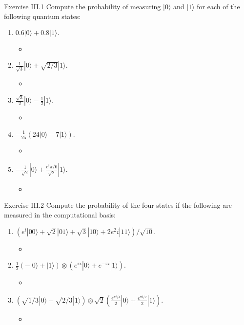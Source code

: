 \documentclass[letterpaper]{article}
\begin{document}
\begin{section}{Exercise III.1}
  Compute the probability of measuring $|0\rangle$ and $|1\rangle$ for each of the following quantum states:
  \begin{enumerate}
    \item $0.6|0\rangle + 0.8|1\rangle$.
    \begin{itemize}
      \item %
  \end{itemize}
    \item $\frac{1}{\sqrt{3}}|0\rangle + \sqrt{2/3}|1\rangle$.
    \begin{itemize}
      \item %
  \end{itemize}
    \item $\frac{\sqrt{3}}{2}|0\rangle - \frac{1}{2}|1\rangle$.
    \begin{itemize}
      \item %
  \end{itemize}
    \item $-\frac{1}{25}(24|0\rangle - 7|1\rangle)$.
    \begin{itemize}
      \item %
  \end{itemize}
    \item $-\frac{1}{\sqrt{2}}|0\rangle + \frac{e^i\pi/6}{\sqrt{2}}|1\rangle$.
    \begin{itemize}
      \item %
  \end{itemize}
  \end{enumerate}
\end{section}
\begin{section}{Exercise III.2}
  Compute the probability of the four states if the following are measured in the computational basis:
  \begin{enumerate}
    \item $(e^i|00\rangle + \sqrt{2}|01\rangle + \sqrt{3}|10\rangle + 2e^2i|11\rangle)/\sqrt{10}$.
    \begin{itemize}
      \item %
  \end{itemize}
    \item $\frac{1}{2}(-|0\rangle+|1\rangle)\otimes(e^{\pi i}|0\rangle + e ^ {-\pi i}|1\rangle)$.
    \begin{itemize}
      \item %
  \end{itemize}
    \item $(\sqrt{1/3}|0\rangle - \sqrt{2/3}|1\rangle)\otimes\sqrt{2}(\frac{e^{\pi i/4}}{2}|0\rangle+\frac{e^{\pi i/2}}{2}|1\rangle)$.
    \begin{itemize}
      \item %
  \end{itemize}
  \end{enumerate}
\end{section}
\end{document}

